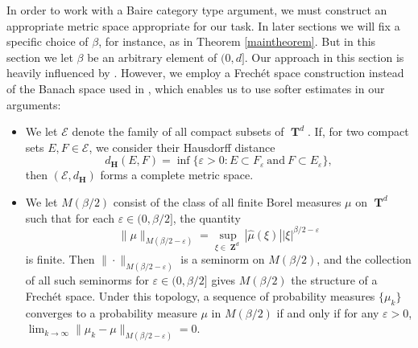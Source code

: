\documentclass[12pt,reqno]{article}
\numberwithin{equation}{section}
\DeclareMathOperator{\ZZ}{\mathbf{Z}}
\DeclareMathOperator{\TT}{\mathbf{T}}
\numberwithin{theorem}{section}
\begin{document}
In order to work with a Baire category type argument, we must construct an appropriate metric space appropriate for our task. In later sections we will fix a specific choice of $\beta$, for instance, as in Theorem \ref{maintheorem}. But in this section we let $\beta$ be an arbitrary element of $(0,d]$. Our approach in this section is heavily influenced by \cite{Korner2}. However, we employ a Frech\'{e}t space construction instead of the Banach space used in \cite{Korner2}, which enables us to use softer estimates in our arguments:
%
\begin{itemize}
    \item We let $\mathcal{E}$ denote the family of all compact subsets of $\TT^d$. If, for two compact sets $E,F \in \mathcal{E}$, we consider their Hausdorff distance
    \[ d_\mathbf{H}(E,F) = \inf \{ \varepsilon > 0 : E \subset F_\varepsilon\ \text{and}\ F \subset E_\varepsilon \}, \]
    then $(\mathcal{E},d_\mathbf{H})$ forms a complete metric space. %

    \item We let $M(\beta/2)$ consist of the class of all finite Borel measures $\mu$ on $\TT^d$ such that for each $\varepsilon \in (0,\beta/2]$, the quantity
    \[ \| \mu \|_{M(\beta/2 - \varepsilon)} = \sup_{\xi \in \ZZ^d} |\widehat{\mu}(\xi)| |\xi|^{\beta/2 - \varepsilon} \]
    is finite. Then $\| \cdot \|_{M(\beta/2 - \varepsilon)}$ is a seminorm on $M(\beta/2)$, and the collection of all such seminorms for $\varepsilon \in (0,\beta/2]$ gives $M(\beta/2)$ the structure of a Frech\'{e}t space. Under this topology, a sequence of probability measures $\{ \mu_k \}$ converges to a probability measure $\mu$ in $M(\beta/2)$ if and only if for any $\varepsilon > 0$, $\lim_{k \to \infty} \| \mu_k - \mu \|_{M(\beta/2 - \varepsilon)} = 0$.
\end{itemize}
\end{document}
